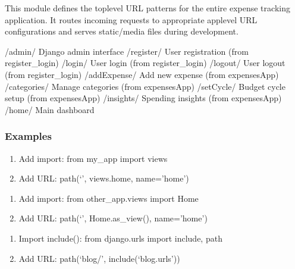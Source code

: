 \documentclass[letterpaper,10pt,english]{sphinxmanual}
\begin{document}
\sphinxAtStartPar
This module defines the top\sphinxhyphen{}level URL patterns for the entire expense tracking
application. It routes incoming requests to appropriate app\sphinxhyphen{}level URL
configurations and serves static/media files during development.
\begin{description}
\sphinxAtStartPar
{}

\sphinxAtStartPar
/admin/          \sphinxhyphen{} Django admin interface
/register/       \sphinxhyphen{} User registration (from register\_login)
/login/          \sphinxhyphen{} User login (from register\_login)
/logout/         \sphinxhyphen{} User logout (from register\_login)
/addExpense/     \sphinxhyphen{} Add new expense (from expensesApp)
/categories/     \sphinxhyphen{} Manage categories (from expensesApp)
/setCycle/       \sphinxhyphen{} Budget cycle setup (from expensesApp)
/insights/       \sphinxhyphen{} Spending insights (from expensesApp)
/home/           \sphinxhyphen{} Main dashboard

\end{description}
\subsubsection*{Examples}
\begin{description}
\begin{enumerate}
%
\item {} 
\sphinxAtStartPar
Add import: from my\_app import views

\item {} 
\sphinxAtStartPar
Add URL: path(‘’, views.home, name=’home’)

\end{enumerate}

\begin{enumerate}
%
\item {} 
\sphinxAtStartPar
Add import: from other\_app.views import Home

\item {} 
\sphinxAtStartPar
Add URL: path(‘’, Home.as\_view(), name=’home’)

\end{enumerate}

\begin{enumerate}
%
\item {} 
\sphinxAtStartPar
Import include(): from django.urls import include, path

\item {} 
\sphinxAtStartPar
Add URL: path(‘blog/’, include(‘blog.urls’))

\end{enumerate}

\end{description}
\end{document}
